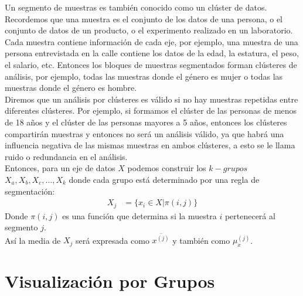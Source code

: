 \documentclass{article}
\begin{document}
Un segmento de muestras es también conocido como un clúster de datos. Recordemos que una muestra es el conjunto de los datos de una persona, o el conjunto de datos de un producto, o el experimento realizado en un laboratorio.
\\[12pt]
Cada muestra contiene información de cada eje, por ejemplo, una muestra de una persona entrevistada en la calle contiene los datos de la edad, la estatura, el peso, el salario, etc. Entonces los bloques de muestras segmentados forman clústeres de análisis, por ejemplo, todas las muestras donde el género es mujer o todas las muestras donde el género es hombre.
\\[12pt]
Diremos que un análisis por clústeres es válido si no hay muestras repetidas entre diferentes clústeres. Por ejemplo, si formamos el clúster de las personas de menos de 18 años y el clúster de las personas mayores a 5 años, entonces los clústeres compartirán muestras y entonces no será un análisis válido, ya que habrá una influencia negativa de las mismas muestras en ambos clústeres, a esto se le llama ruido o redundancia en el análisis.
\\[12pt]
Entonces, para un eje de datos $X$ podemos construir los $k-grupos$ $X_{a}, X_{b}, X_{c}, ..., X_{k}$ donde cada grupo está determinado por una regla de segmentación:
\begin{equation}
    \begin{aligned}
        X_{j} &= \{ x_i \in X | \pi(i, j) \}
    \end{aligned}
\end{equation}
Donde $\pi(i, j)$ es una función que determina si la muestra $i$ pertenecerá al segmento $j$.
\\[12pt]
Así la media de $X_j$ será expresada como $\overline{x^{(j)}}$ y también como $\mu_x^{(j)}$.

\section{Visualización por Grupos}
\end{document}
